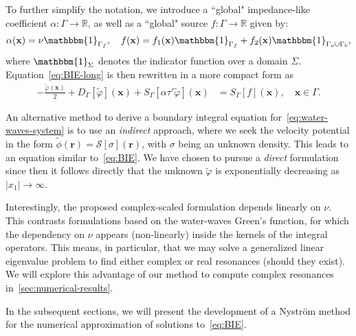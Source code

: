 \documentclass[review,hidelinks,onefignum,onetabnum]{siamart220329}
\newcommand{\R}{\mathbb{R}}
\newcommand{\bx}{\mathbf{x}}
\newcommand{\br}{\boldsymbol{r}}
\newcommand{\tvarphi}{\widetilde \varphi}
\begin{document}
To further simplify the notation, we introduce a ``global" impedance-like coefficient $\alpha : \Gamma \to \R$, as well as a ``global" source $f : \Gamma \to \R$ given by:
\begin{align}
    \alpha(\bx) = \nu\mathbbm{1}_{\Gamma_f}, \quad f(\bx) = f_1(\bx) \mathbbm{1}_{\Gamma_f} + f_2(\bx) \mathbbm{1}_{\Gamma_o \cup \Gamma_b},
\end{align}
where $\mathbbm{1}_{\Sigma}$ denotes the indicator function over a domain $\Sigma$. Equation~\cref{eq:BIE-long} is then rewritten in a more compact form as 
%
\begin{align}
  \label{eq:BIE}
  -\frac{\tvarphi(\bx)}{2} + D_{\Gamma}[\tvarphi](\bx) + S_\Gamma\left[\alpha\tau'\tvarphi\right](\bx) &= S_{\Gamma}[f](\bx), \quad \bx \in \Gamma.
\end{align}

\begin{remark}
  An alternative method to derive a boundary integral equation
  for~\cref{eq:water-waves-system} is to use an \emph{indirect} approach, where
  we seek the velocity potential in the form $\widetilde{\phi}(\br) =
  \mathcal{S}[\sigma](\br)$, with $\sigma$ being an unknown density. This leads
  to an equation similar to~\cref{eq:BIE}. We have chosen to pursue a
  \emph{direct} formulation since then it follows directly that the unknown
  $\tvarphi$ is exponentially decreasing as $|x_1| \to \infty$. 
\end{remark}

\begin{remark}\label{rem:linear_eig_problem}
Interestingly, the proposed complex-scaled formulation depends linearly on  $\nu$. This contrasts formulations based on the water-waves Green's function, for which the dependency on $\nu$ appears (non-linearly) inside the kernels of the integral operators. This means, in particular, that we may solve a generalized linear eigenvalue problem to find either complex or real resonances (should they exist). We will explore this advantage of our method to compute complex resonances in~\cref{sec:numerical-results}. 
\end{remark}


In the subsequent sections, we will present the development of a Nystr\"om method for the numerical approximation of solutions to~\eqref{eq:BIE}. 
\end{document}
